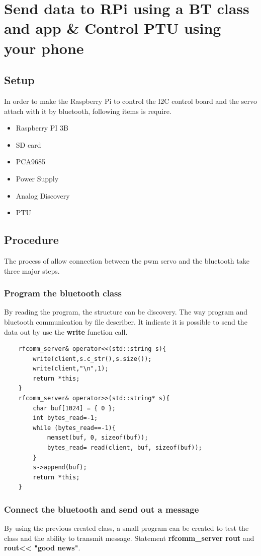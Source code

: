 \documentclass{article}
\begin{document}
\section{Send data to RPi using a BT class and app \& Control PTU using your phone}
\subsection{Setup}
In order to make the Raspberry Pi to control the I2C control board and the servo attach with it by bluetooth, following items is require.
\begin{itemize}
	\item Raspberry PI 3B
	\item SD card
	\item PCA9685
	\item Power Supply
	\item Analog Discovery
	\item PTU
\end{itemize}
\subsection{Procedure}
The process of allow connection between the pwm servo and the bluetooth take three major steps.
\subsubsection{Program the bluetooth class}
By reading the program, the structure can be discovery. The way program and bluetooth communication by file describer. It indicate it is possible to send the data out by use the \textbf{write} function call.
\begin{lstlisting}
    rfcomm_server& operator<<(std::string s){
		write(client,s.c_str(),s.size());
		write(client,"\n",1);
		return *this;
	}
	rfcomm_server& operator>>(std::string* s){
		char buf[1024] = { 0 };
		int bytes_read=-1;
		while (bytes_read==-1){
			memset(buf, 0, sizeof(buf));
			bytes_read= read(client, buf, sizeof(buf));
		}
		s->append(buf);
		return *this;
	}
\end{lstlisting}
\subsubsection{Connect the bluetooth and send out a message}
By using the previous created class, a small program can be created to test the class and the ability to transmit message. Statement \textbf{rfcomm\_server rout} and \textbf{rout<< "good news"}.
\end{document}
